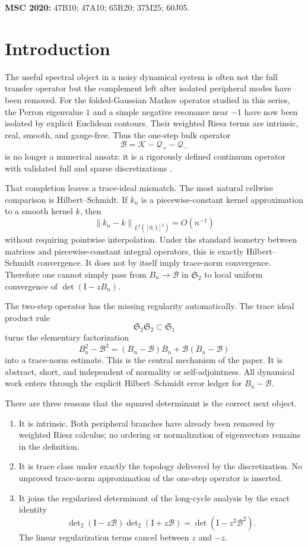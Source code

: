 \documentclass[11pt]{article}
\theoremstyle{definition}
\theoremstyle{remark}
\newcommand{\Id}{\mathrm I}
\newcommand{\cK}{\mathcal K}
\newcommand{\cB}{\mathcal B}
\newcommand{\cQ}{\mathcal Q}
\newcommand{\norm}[1]{\left\lVert #1\right\rVert}
\newcommand{\detF}{\operatorname{det}}
\newcommand{\Dettwo}{\operatorname{det}\nolimits_2}
\begin{document}
\medskip
\noindent\textbf{MSC 2020:} 47B10; 47A10; 65R20; 37M25; 60J05.

\section{Introduction}
\label{sec:introduction}

The useful spectral object in a noisy dynamical system is often not the
full transfer operator but the complement left after isolated peripheral
modes have been removed.  For the folded-Gaussian Markov operator studied
in this series, the Perron eigenvalue $1$ and a simple negative resonance
near $-1$ have now been isolated by explicit Euclidean contours.  Their
weighted Riesz terms are intrinsic, real, smooth, and gauge-free.  Thus the
one-step bulk operator
\begin{equation}
 \cB=\cK-\cQ_+-\cQ_-
 \label{eq:bulk-intro}
\end{equation}
is no longer a numerical ansatz: it is a rigorously defined continuum
operator with validated full and sparse discretizations
\citep{WangParityKernel2026,WangRankTwo2026}.

That completion leaves a trace-ideal mismatch.  The most natural
cellwise comparison is Hilbert--Schmidt.  If $k_n$ is a piecewise-constant
kernel approximation to a smooth kernel $k$, then
\[
 \norm{k_n-k}_{L^2([0,1]^2)}=O(n^{-1})
\]
without requiring pointwise interpolation.  Under the standard isometry
between matrices and piecewise-constant integral operators, this is exactly
Hilbert--Schmidt convergence.  It does not by itself imply trace-norm
convergence.  Therefore one cannot simply pass from
$B_n\to\cB$ in $\mathfrak S_2$ to local uniform convergence of
$\detF(\Id-zB_n)$.

The two-step operator has the missing regularity automatically.  The trace
ideal product rule
\[
 \mathfrak S_2\mathfrak S_2\subset\mathfrak S_1
\]
turns the elementary factorization
\[
 B_n^2-\cB^2=(B_n-\cB)B_n+\cB(B_n-\cB)
\]
into a trace-norm estimate.  This is the central mechanism of the paper.
It is abstract, short, and independent of normality or self-adjointness.
All dynamical work enters through the explicit Hilbert--Schmidt error
ledger for $B_n-\cB$.

There are three reasons that the squared determinant is the correct next
object.
\begin{enumerate}[leftmargin=2em]
 \item It is intrinsic.  Both peripheral branches have already been
 removed by weighted Riesz calculus; no ordering or normalization of
 eigenvectors remains in the definition.
 \item It is trace class under exactly the topology delivered by the
 discretization.  No unproved trace-norm approximation of the one-step
 operator is inserted.
 \item It joins the regularized determinant of the long-cycle analysis by
 the exact identity
 \[
  \Dettwo(\Id-z\cB)\Dettwo(\Id+z\cB)
  =\detF(\Id-z^2\cB^2).
 \]
 The linear regularization terms cancel between $z$ and $-z$.
\end{enumerate}
\end{document}
